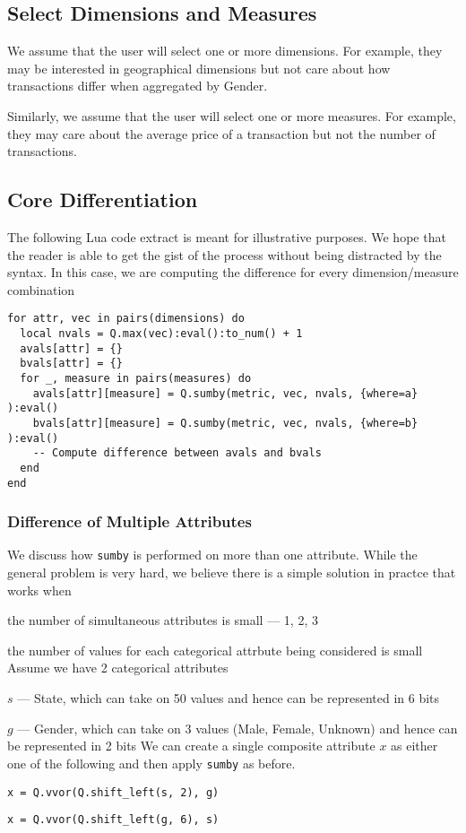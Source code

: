 \subsection{Select Dimensions and Measures}
\label{DimsAndMeasures}

We assume that the user will select one or more dimensions. For example, they
may be interested in geographical dimensions but not care about how transactions
differ when aggregated by Gender. 

Similarly, we assume that the user will select one or more measures. For
example, they may care about the average
price of a transaction but not the number of transactions.

\subsection{Core Differentiation}
\label{Differentiation}

The following Lua code extract is meant for illustrative purposes. We hope that
the reader is able to get the gist of the process without being distracted by
the syntax. In this case, we are computing the difference for every
dimension/measure combination
\begin{verbatim}
for attr, vec in pairs(dimensions) do 
  local nvals = Q.max(vec):eval():to_num() + 1
  avals[attr] = {}
  bvals[attr] = {}
  for _, measure in pairs(measures) do 
    avals[attr][measure] = Q.sumby(metric, vec, nvals, {where=a} ):eval()
    bvals[attr][measure] = Q.sumby(metric, vec, nvals, {where=b} ):eval()
    -- Compute difference between avals and bvals
  end
end
\end{verbatim}

\subsubsection{Difference of Multiple Attributes}

We discuss how {\tt sumby} is performed on more than one attribute. While the
general problem is very hard, we believe there is a simple solution in practce
that works when
\be
\item the number of simultaneous attributes is small --- 1, 2, 3
\item the number of values for each categorical attrbute being considered is
small
\ee
Assume we have 2 categorical attributes
\be
\item \(s\) --- State, which can take on 50 values and hence can be represented in 6 bits
\item \(g\) --- Gender, which can take on 3 values (Male, Female, Unknown) and hence can
be represented in 2 bits
\ee
We can create a single composite attribute \(x\) as either one of the following
and then apply {\tt sumby} as before. 
\be
\item \verb+x = Q.vvor(Q.shift_left(s, 2), g)+
\item \verb+x = Q.vvor(Q.shift_left(g, 6), s)+
\ee

